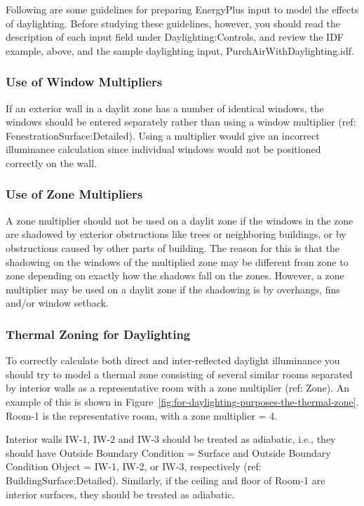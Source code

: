Following are some guidelines for preparing EnergyPlus input to model the effects of daylighting. Before studying these guidelines, however, you should read the description of each input field under Daylighting:Controls, and review the IDF example, above, and the sample daylighting input, PurchAirWithDaylighting.idf.

\subsubsection{Use of Window Multipliers}\label{use-of-window-multipliers}

If an exterior wall in a daylit zone has a number of identical windows, the windows should be entered separately rather than using a window multiplier (ref: FenestrationSurface:Detailed). Using a multiplier would give an incorrect illuminance calculation since individual windows would not be positioned correctly on the wall.

\subsubsection{Use of Zone Multipliers}\label{use-of-zone-multipliers}

A zone multiplier should not be used on a daylit zone if the windows in the zone are shadowed by exterior obstructions like trees or neighboring buildings, or by obstructions caused by other parts of building. The reason for this is that the shadowing on the windows of the multiplied zone may be different from zone to zone depending on exactly how the shadows fall on the zones. However, a zone multiplier may be used on a daylit zone if the shadowing is by overhangs, fins and/or window setback.

\subsubsection{Thermal Zoning for Daylighting}\label{thermal-zoning-for-daylighting}

To correctly calculate both direct and inter-reflected daylight illuminance you should try to model a thermal zone consisting of several similar rooms separated by interior walls as a representative room with a zone multiplier (ref: Zone). An example of this is shown in Figure~\ref{fig:for-daylighting-purposes-the-thermal-zone}. Room-1 is the representative room, with a zone multiplier = 4.

Interior walls IW-1, IW-2 and IW-3 should be treated as adiabatic, i.e., they should have Outside Boundary Condition = Surface and Outside Boundary Condition Object = IW-1, IW-2, or IW-3, respectively (ref: BuildingSurface:Detailed). Similarly, if the ceiling and floor of Room-1 are interior surfaces, they should be treated as adiabatic.

